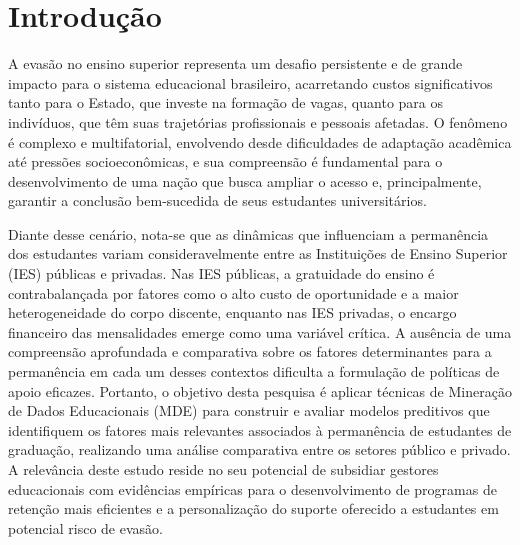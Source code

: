 \documentclass[english, brazilian]{RBIEarticle}
\begin{document}
\pagebreak


\section{Introdução}
A evasão no ensino superior representa um desafio persistente e de grande impacto para o sistema educacional brasileiro, acarretando custos significativos tanto para o Estado, que investe na formação de vagas, quanto para os indivíduos, que têm suas trajetórias profissionais e pessoais afetadas. O fenômeno é complexo e multifatorial, envolvendo desde dificuldades de adaptação acadêmica até pressões socioeconômicas, e sua compreensão é fundamental para o desenvolvimento de uma nação que busca ampliar o acesso e, principalmente, garantir a conclusão bem-sucedida de seus estudantes universitários.

Diante desse cenário, nota-se que as dinâmicas que influenciam a permanência dos estudantes variam consideravelmente entre as Instituições de Ensino Superior (IES) públicas e privadas. Nas IES públicas, a gratuidade do ensino é contrabalançada por fatores como o alto custo de oportunidade e a maior heterogeneidade do corpo discente, enquanto nas IES privadas, o encargo financeiro das mensalidades emerge como uma variável crítica. A ausência de uma compreensão aprofundada e comparativa sobre os fatores determinantes para a permanência em cada um desses contextos dificulta a formulação de políticas de apoio eficazes. Portanto, o objetivo desta pesquisa é aplicar técnicas de Mineração de Dados Educacionais (MDE) para construir e avaliar modelos preditivos que identifiquem os fatores mais relevantes associados à permanência de estudantes de graduação, realizando uma análise comparativa entre os setores público e privado. A relevância deste estudo reside no seu potencial de subsidiar gestores educacionais com evidências empíricas para o desenvolvimento de programas de retenção mais eficientes e a personalização do suporte oferecido a estudantes em potencial risco de evasão.
\end{document}
